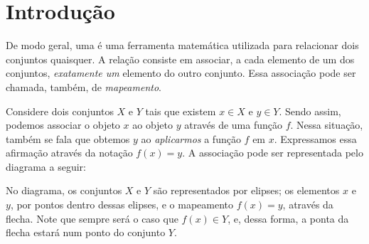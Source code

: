 \section{Introdução}

De modo geral, uma  é uma ferramenta matemática utilizada para relacionar dois conjuntos quaisquer. 
A relação consiste em associar, a cada elemento de um dos conjuntos, \emph{exatamente um} elemento do outro conjunto.
Essa associação pode ser chamada, também, de \emph{mapeamento}.

Considere dois conjuntos $X$ e $Y$ tais que existem $x \in X$ e $y \in Y$. Sendo assim, podemos associar o objeto $x$ ao objeto $y$ através de uma função $f$. Nessa situação, também se fala que obtemos $y$ ao \emph{aplicarmos} a função $f$ em $x$. Expressamos essa afirmação através da notação $f(x) = y$. A associação pode ser representada pelo diagrama a seguir:
%
\begin{center}
\end{center}
%
No diagrama, os conjuntos $X$ e $Y$ são representados por elipses; os elementos $x$ e $y$, por pontos dentro dessas elipses, e o mapeamento $f(x) = y$, através da flecha. Note que sempre será o caso que $f(x) \in Y$, e, dessa forma, a ponta da flecha estará num ponto do conjunto $Y$.